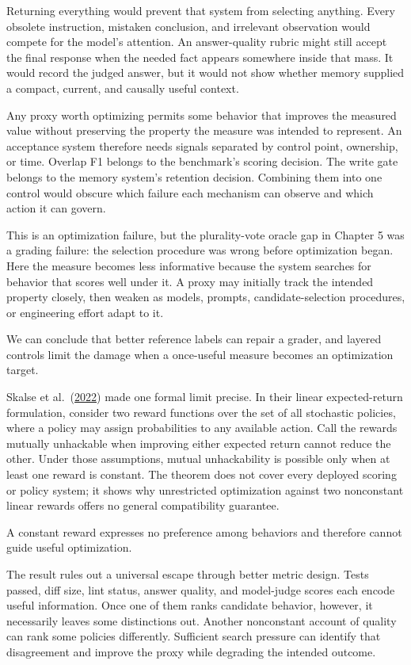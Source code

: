 Returning everything would prevent that system from selecting anything. Every obsolete instruction, mistaken conclusion, and irrelevant observation would compete for the model's attention. An answer-quality rubric might still accept the final response when the needed fact appears somewhere inside that mass. It would record the judged answer, but it would not show whether memory supplied a compact, current, and causally useful context.

Any proxy worth optimizing permits some behavior that improves the measured value without preserving the property the measure was intended to represent. An acceptance system therefore needs signals separated by control point, ownership, or time. Overlap F1 belongs to the benchmark's scoring decision. The write gate belongs to the memory system's retention decision. Combining them into one control would obscure which failure each mechanism can observe and which action it can govern.

This is an optimization failure, but the plurality-vote oracle gap in Chapter 5 was a grading failure: the selection procedure was wrong before optimization began. Here the measure becomes less informative because the system searches for behavior that scores well under it. A proxy may initially track the intended property closely, then weaken as models, prompts, candidate-selection procedures, or engineering effort adapt to it.

We can conclude that better reference labels can repair a grader, and layered controls limit the damage when a once-useful measure becomes an optimization target.

Skalse et al.~(\href{https://arxiv.org/abs/2209.13085}{2022}) made one formal limit precise. In their linear expected-return formulation, consider two reward functions over the set of all stochastic policies, where a policy may assign probabilities to any available action. Call the rewards mutually unhackable when improving either expected return cannot reduce the other. Under those assumptions, mutual unhackability is possible only when at least one reward is constant. The theorem does not cover every deployed scoring or policy system; it shows why unrestricted optimization against two nonconstant linear rewards offers no general compatibility guarantee.

A constant reward expresses no preference among behaviors and therefore cannot guide useful optimization.

The result rules out a universal escape through better metric design. Tests passed, diff size, lint status, answer quality, and model-judge scores each encode useful information. Once one of them ranks candidate behavior, however, it necessarily leaves some distinctions out. Another nonconstant account of quality can rank some policies differently. Sufficient search pressure can identify that disagreement and improve the proxy while degrading the intended outcome.

